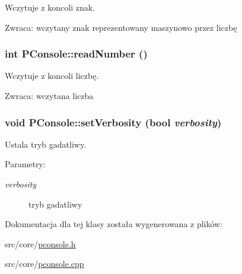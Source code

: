 Wczytuje z koncoli znak. \begin{Desc}
\item[Zwraca:]wczytany znak reprezentowany maszynowo przez liczbę \end{Desc}
\hypertarget{classPConsole_fbe2b8e906db6d9fc70397d8a9b4105c}{
\subsubsection[{readNumber}]{\setlength{\rightskip}{0pt plus 5cm}int PConsole::readNumber ()}}
\label{classPConsole_fbe2b8e906db6d9fc70397d8a9b4105c}


Wczytuje z koncoli liczbę. \begin{Desc}
\item[Zwraca:]wczytana liczba \end{Desc}
\hypertarget{classPConsole_b5446c4f888fe9552788a2e757f23b6b}{
\subsubsection[{setVerbosity}]{\setlength{\rightskip}{0pt plus 5cm}void PConsole::setVerbosity (bool {\em verbosity})}}
\label{classPConsole_b5446c4f888fe9552788a2e757f23b6b}


Ustala tryb gadatliwy. \begin{Desc}
\item[Parametry:]
\begin{description}
\item[{\em verbosity}]tryb gadatliwy \end{description}
\end{Desc}


Dokumentacja dla tej klasy została wygenerowana z plików:\begin{CompactItemize}
\item 
src/core/\hyperlink{pconsole_8h}{pconsole.h}\item 
src/core/\hyperlink{pconsole_8cpp}{pconsole.cpp}\end{CompactItemize}
